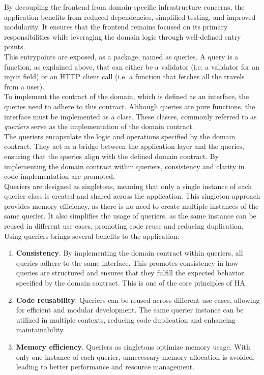 \documentclass[../design.tex]{subfiles}
\begin{document}
By decoupling the frontend from domain-specific infrastructure concerns, the
application benefits from reduced dependencies, simplified testing, and improved
modularity. It ensures that the frontend remains focused on its primary
responsibilities while leveraging the domain logic through well-defined entry
points.
\\[8pt]
This entrypoints are exposed, as a package, named as queries. A query is a
function, as explained above, that can either be a validator (i.e. a validator
for an input field) or an HTTP client call (i.e. a function that fetches all the
travels from a user).
\\
To implement the contract of the domain, which is defined as an interface, the
queries need to adhere to this contract. Although queries are pure functions,
the interface must be implemented as a class. These classes, commonly referred
to as \emph{queriers} serve as the implementation of the domain contract.
\\
The queriers encapsulate the logic and operations specified by the domain
contract. They act as a bridge between the application layer and the queries,
ensuring that the queries align with the defined domain contract. By
implementing the domain contract within queriers, consistency and clarity in
code implementation are promoted.
\\
Queriers are designed as singletons, meaning that only a single instance of each
querier class is created and shared across the application. This singleton
approach provides memory efficiency, as there is no need to create multiple
instances of the same querier. It also simplifies the usage of queriers, as the
same instance can be reused in different use cases, promoting code reuse and
reducing duplication. Using queriers brings several benefits to the application:
\begin{enumerate}
	\item\textbf{Consistency}. By implementing the domain contract within
	queriers, all queries adhere to the same interface. This promotes
	consistency in how queries are structured and ensures that they fulfill the
	expected behavior specified by the domain contract. This is one of the core
	principles of HA.
	\item\textbf{Code reusability}. Queriers can be reused across different use
	cases, allowing for efficient and modular development. The same querier
	instance can be utilized in multiple contexts, reducing code duplication
	and enhancing maintainability.
	\item\textbf{Memory efficiency}. Queriers as singletons optimize memory
	usage. With only one instance of each querier, unnecessary memory
	allocation is avoided, leading to better performance and resource
	management.
\end{enumerate}
\end{document}
